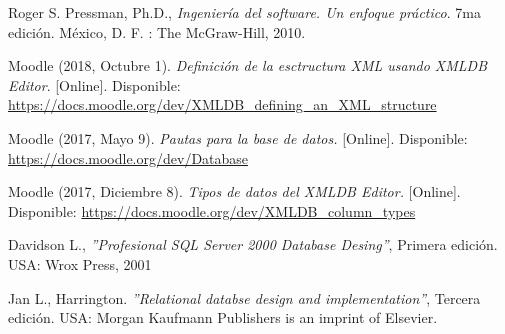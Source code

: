 \begin{thebibliography}{9}
    
    
    
    
        Roger S. Pressman, Ph.D., \textit{Ingeniería del software. Un enfoque práctico}. 7ma edición. México, D. F. : The McGraw-Hill, 2010. 
    
         Moodle  (2018, Octubre 1).\textit{ Definición de la esctructura XML usando XMLDB Editor}.  [Online]. Disponible: \url{ https://docs.moodle.org/dev/XMLDB_defining_an_XML_structure}   
     
     
          Moodle (2017, Mayo 9). \textit{Pautas para la base de datos.} [Online]. Disponible: \url{https://docs.moodle.org/dev/Database}
    
        Moodle  (2017, Diciembre 8). \textit{Tipos de datos del XMLDB Editor.} [Online]. Disponible: \url{https://docs.moodle.org/dev/XMLDB_column_types}
  
        Davidson L., \textit{''Profesional SQL Server 2000 Database Desing''}, Primera edición. USA: Wrox Press, 2001
  
        Jan L., Harrington. \textit{''Relational databse design and implementation''}, Tercera edición. USA: Morgan Kaufmann Publishers is an imprint of Elsevier. 
   
\begin{comment}
    
     
    \bibitem{objetivo2}
        B. Marín, J. Frez, J. Cruz-Lemus, and M. Genero. 2018.
        \textit{An Empirical Investigation on the Benefits of Gamification in Programming Courses.} ACM Trans. Comput. Educ. 19, 1, Article 4 (November 2018), 22 pages.
    
    \bibitem{arte12}
        M. García-Iruela and R. Hijón-Neira, 
        \textit{"Proposal of a management interface for gamified environments in Moodle,"} 2018 International Symposium on Computers in Education (SIIE), Jerez, 2018, p. 2.
        

\end{comment}
\end{thebibliography}
